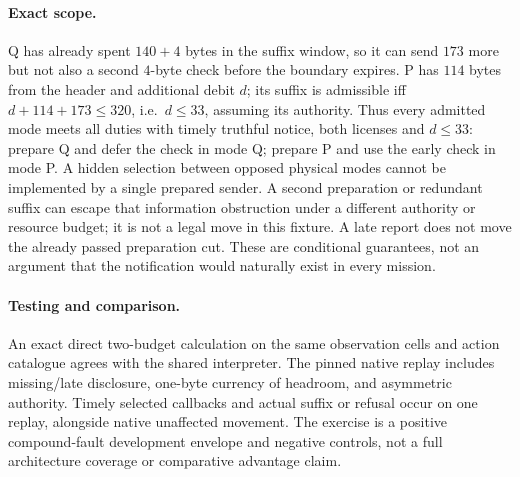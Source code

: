 \documentclass{article}
\begin{document}
\paragraph{Exact scope.}
Q has already spent \(140+4\) bytes in the suffix window, so it can send \(173\) more but not also a second \(4\)-byte check before the boundary expires. P has \(114\) bytes from the header and additional debit \(d\); its suffix is admissible iff \(d+114+173\le320\), i.e.\ \(d\le33\), assuming its authority. Thus every admitted mode meets all duties with timely truthful notice, both licenses and \(d\le33\): prepare Q and defer the check in mode Q; prepare P and use the early check in mode P. A hidden selection between opposed physical modes cannot be implemented by a single prepared sender. A second preparation or redundant suffix can escape that information obstruction under a different authority or resource budget; it is not a legal move in this fixture. A late report does not move the already passed preparation cut. These are conditional guarantees, not an argument that the notification would naturally exist in every mission.

\paragraph{Testing and comparison.}
An exact direct two-budget calculation on the same observation cells and action catalogue agrees with the shared interpreter. The pinned native replay includes missing/late disclosure, one-byte currency of headroom, and asymmetric authority. Timely selected callbacks and actual suffix or refusal occur on one replay, alongside native unaffected movement. The exercise is a positive compound-fault development envelope and negative controls, not a full architecture coverage or comparative advantage claim.
\end{document}
